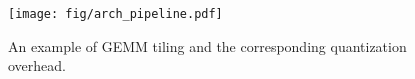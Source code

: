 \begin{figure}[t] 
    \centering 
    \texttt{[image: fig/arch\_pipeline.pdf]}  
    \caption{An example of GEMM tiling and the corresponding quantization overhead.}
    \label{fig:arch_pipeline}
\end{figure}